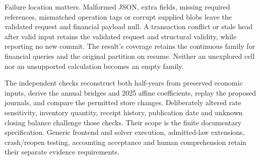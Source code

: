 Failure location matters. Malformed JSON, extra fields, missing required
references, mismatched operation tags or corrupt supplied blobs leave the
validated request and financial payload null. A transaction conflict or stale
head after valid input retains the validated request and structural validity,
while reporting no new commit. The result's coverage retains the continuous
family for financial queries and the original partition on resume. Neither an
unexplored cell nor an unsupported calculation becomes an empty family.

The independent checks reconstruct both half-years from preserved economic
inputs, derive the annual bridges and 2025 affine coefficients, replay the
proposed journals, and compare the permitted store changes. Deliberately altered
rate sensitivity, inventory quantity, receipt history, publication date and
unknown closing balance challenge those checks. Their scope is the finite
documentary specification. Generic frontend and solver execution, admitted-law
extensions, crash/reopen testing, accounting acceptance and human comprehension
retain their separate evidence requirements.
